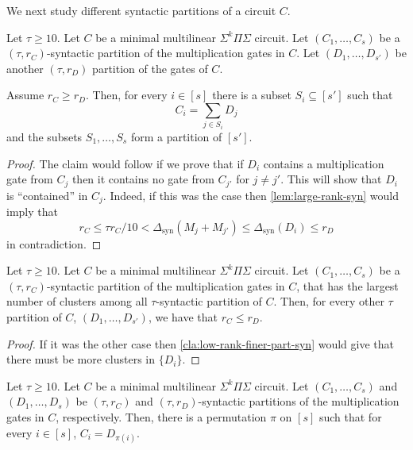 \documentclass[12pt]{article}
\newcommand{\Sps}[1]{\Sigma^{#1} \Pi\Sigma}
\newcommand{\ranksyn}{\Delta_{\text{syn}}}
\begin{document}
	
	
	
	
	We next study different syntactic partitions of a circuit $C$.
	
	\begin{claim}
		\label{cla:low-rank-finer-part-syn}
		Let $\tau \ge 10$.
		Let $C$ be a minimal multilinear $\Sps{k}$ circuit. Let $(C_1, \ldots, C_s)$ be a $(\tau, r_C)$-syntactic partition of the multiplication gates in $C$. Let $(D_1, \ldots, D_{s'})$ be another $(\tau, r_D)$ partition of the gates of $C$.
		
		Assume $r_C \ge r_D$. Then, for every $i \in [s]$ there is a subset $S_i \subseteq [s']$ such that
		\[
		C_i = \sum_{j \in S_i} D_j
		\]
		and the subsets $S_1, \ldots, S_s$ form a partition of $[s']$.
	\end{claim}
	
	\begin{proof}
		The claim would follow if we prove that if $D_i$ contains a multiplication gate from $C_j$ then it contains no gate from $C_{j'}$ for $j\neq j'$. This will show that $D_i$ is ``contained'' in $C_j$. Indeed, if this was the case then \autoref{lem:large-rank-syn} would imply that
		\[
		r_C\leq \tau r_C/10 < \ranksyn(M_j+M_{j'})\leq \ranksyn(D_i)\leq r_D
		\]
		in contradiction.
	\end{proof}
	
	
	\begin{corollary}\label{cor:max-clus-min-rank-syn}
		Let $\tau \ge 10$. Let $C$ be a minimal multilinear $\Sps{k}$ circuit. Let $(C_1, \ldots, C_s)$ be a $(\tau, r_C)$-syntactic partition of the multiplication gates in $C$,
		that has the largest number of clusters among all $\tau$-syntactic partition of $C$. Then, for every other $\tau$ partition of $C$, $(D_1, \ldots, D_{s'})$, we have that $r_C\leq r_{D}$.
	\end{corollary}
	
	\begin{proof}
		If it was the other case then \autoref{cla:low-rank-finer-part-syn} would give that there must be more clusters in $\{D_i\}$. 
	\end{proof}
	
	
	\begin{corollary}\label{cor:unique-syntactic}
		Let $\tau \ge 10$. Let $C$ be a minimal multilinear $\Sps{k}$ circuit.
		Let $(C_1, \ldots, C_s)$ and  $(D_1, \ldots, D_s)$ be $(\tau, r_C)$ and $(\tau, r_D)$-syntactic partitions of the multiplication gates in $C$, respectively.
		Then, there is a permutation $\pi$ on $[s]$ such that for every $i\in[s]$, $C_i=D_{\pi(i)}$.
	\end{corollary}
	
\end{document}

